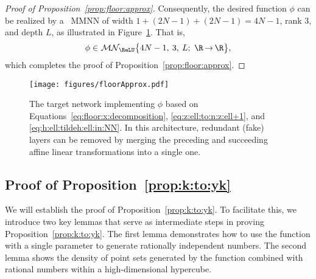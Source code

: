\documentclass[11pt,a4paper]{article}
\begin{document}
\begin{proof}[Proof of Proposition~\ref{prop:floor:approx}]
Consequently, the desired function \( \phi \) can be realized by a \ReLU\ MMNN of width \( 1 + (2N - 1) + (2N - 1) = 4N - 1 \), rank $3$, and depth \( L \), as illustrated in Figure~\ref{fig:floorApprox}. That is,
\[\phi \in \mn[\big]{\ReLU}{4N-1}{3}{L}{\R}{\R},\]
which completes the proof of Proposition~\ref{prop:floor:approx}.
\end{proof}
\begin{figure}[ht]
    \centering   \texttt{[image: figures/floorApprox.pdf]}
\caption{The target network implementing $\phi$ based on Equations~\eqref{eq:floor:x:decomposition}, \eqref{eq:z:ell:to:n:z:ell+1}, and \eqref{eq:h:ell:tildeh:ell:in:NN}. In this architecture, redundant (fake) layers can be removed by merging the preceding and succeeding affine linear transformations into a single one.}
    \label{fig:floorApprox}
\end{figure}



%



\subsection{Proof of Proposition~\ref{prop:k:to:yk}}
\label{sec:proof:prop:k:to:yk}


We will establish the proof of Proposition~\ref{prop:k:to:yk}. To facilitate this, we introduce two key lemmas that serve as intermediate steps in proving Proposition~\ref{prop:k:to:yk}. 
The first lemma demonstrates how to use the \sine{}  function with a single parameter to generate rationally independent numbers. The second lemma shows the density of point sets generated by the \sine{}  function combined with rational numbers within a high-dimensional hypercube.
\end{document}
